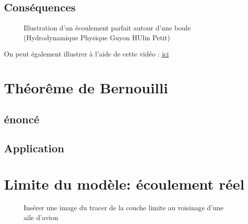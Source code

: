 \documentclass[10pt]{beamer}
\begin{document}
\subsection{Conséquences}

\begin{frame}{\insertsubsection}
    \begin{figure}
        \centering
        \caption{Illustration d'un écoulement parfait autour d'une boule (Hydrodynamique Physique Guyon HUlin Petit)}
    \end{figure}
    On peut également illustrer à l'aide de cette vidéo : \href{https://www.youtube.com/watch?v=2Z6UJbwxBZI&ab_channel=ryanhaart}{ici}
\end{frame}

\section{Théorême de Bernouilli}
\subsection{énoncé}
\subsection{Application}
\section{Limite du modèle: écoulement réel}
\begin{frame}{\insertsubsection}
    \begin{figure}
        \centering
        \caption{Insérer une image du tracer de la couche limite au voisinage d'une aile d'avion}
    \end{figure}
\end{frame}
\end{document}
